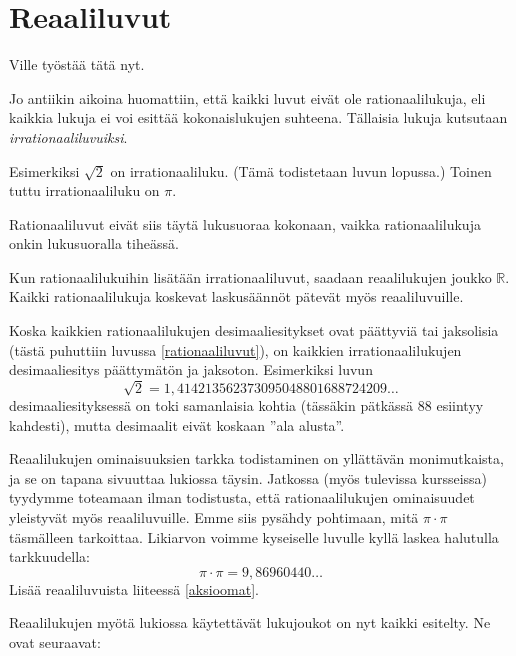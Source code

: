 \chapter{Reaaliluvut}

Ville työstää tätä nyt.

Jo antiikin aikoina huomattiin, että kaikki luvut eivät ole rationaalilukuja, eli kaikkia lukuja ei voi esittää kokonaislukujen suhteena. Tällaisia lukuja kutsutaan \emph{irrationaaliluvuiksi}.

Esimerkiksi $\sqrt{2}$ on irrationaaliluku. (Tämä todistetaan
luvun lopussa.) Toinen tuttu irrationaaliluku on $\pi$.

Rationaaliluvut eivät siis täytä lukusuoraa kokonaan, vaikka
rationaalilukuja onkin lukusuoralla tiheässä.


Kun rationaalilukuihin lisätään irrationaaliluvut, saadaan reaalilukujen joukko $\mathbb{R}$. Kaikki rationaalilukuja koskevat
laskusäännöt pätevät myös reaaliluvuille.

Koska kaikkien rationaalilukujen desimaaliesitykset ovat päättyviä tai jaksolisia (tästä puhuttiin luvussa \ref{rationaaliluvut}), on
kaikkien irrationaalilukujen desimaaliesitys päättymätön ja jaksoton. Esimerkiksi luvun
\[\sqrt{2}= 1,414213562373095048801688724209\ldots\]
desimaaliesityksessä on toki samanlaisia kohtia
(tässäkin pätkässä 88 esiintyy kahdesti), mutta desimaalit eivät koskaan ''ala alusta''.

Reaalilukujen ominaisuuksien tarkka todistaminen on yllättävän monimutkaista, ja se on tapana sivuuttaa lukiossa täysin. Jatkossa
(myös tulevissa kursseissa) tyydymme toteamaan ilman todistusta, että rationaalilukujen ominaisuudet yleistyvät myös reaaliluvuille.
Emme siis pysähdy pohtimaan, mitä $\pi \cdot \pi$ täsmälleen tarkoittaa. Likiarvon voimme kyseiselle luvulle kyllä laskea
halutulla tarkkuudella:
\[ \pi\cdot \pi =9,86960440\ldots \]
Lisää reaaliluvuista liiteessä \ref{aksioomat}.

Reaalilukujen myötä lukiossa käytettävät lukujoukot on nyt kaikki esitelty. Ne ovat seuraavat:




